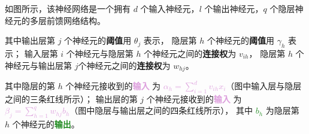 \documentclass[../studies-ml.tex]{subfiles}
\begin{document}
\begin{center}
\end{center}

如图所示，该神经网络是一个拥有 $d$ 个输入神经元，$l$ 个输出神经元，$q$ 个隐层神经元的多层前馈网络结构。
\bigbreak

其中输出层第 $j$ 个神经元的\textcolor{Cerulean}{\textbf{阈值}}用 \textcolor{Cerulean}{$\theta_j$} 表示，
隐层第 $h$ 个神经元的\textcolor{Cerulean}{\textbf{阈值}}用 \textcolor{Cerulean}{$\gamma_h$} 表示；
输入层第 $i$ 个神经元与隐层第 $h$ 个神经元之间的\textcolor{BurntOrange}{\textbf{连接权}}为 \textcolor{BurntOrange}{$v_{ih}$}，
隐层第 $h$ 个神经元与输出层第 $j$个神经元之间的\textcolor{BurntOrange}{\textbf{连接权}}为 \textcolor{BurntOrange}{$w_{hj}$}。
\bigbreak

其中隐层的第 $h$ 个神经元接收到的\textcolor{Plum}{\textbf{输入}}
为 \textcolor{Plum}{$\alpha_h = \sum_{i=1}^{d} v_{ih} x_i$}（图中输入层与隐层之间的三条红线所示）；
输出层的第 $j$ 个神经元接收到的\textcolor{Plum}{\textbf{输入}}
为 \textcolor{Plum}{$\beta_j = \sum_{h=1}^{q} w_{hj} b_h$}（图中隐层与输出层之间的四条红线所示），
其中 \textcolor{ForestGreen}{$b_h$} 为隐层第 $h$ 个神经元的\textcolor{ForestGreen}{\textbf{输出}}。
\bigbreak
\end{document}
